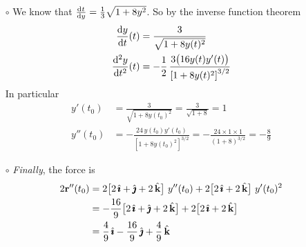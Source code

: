 \begin{solution}
\begin{itemize}
\item[$\circ$] We know that $\diff{t}{y} =\frac{1}{3}\sqrt{1+8y^2}$.
So by the inverse function theorem
\begin{align*}
\diff{y}{t}(t) 
   &=\frac{3}{\sqrt{1+8y(t)^2}} \\
\difftwo{y}{t}(t) 
   &=-\frac{1}{2}\,\frac{3\big(16y(t)y'(t)\big)}{{[1+8y(t)^2]}^{3/2}} \\
\end{align*}
In particular 
\begin{align*}
y'(t_0) 
   &=\frac{3}{\sqrt{1+8y(t_0)^2}}
    =\frac{3}{\sqrt{1+8}}
    =1 \\
y''(t_0) 
   &=-\frac{24\,y(t_0)y'(t_0)}{{[1+8y(t_0)^2]}^{3/2}}
    = - \frac{24\times 1\times 1}{{(1+8)}^{3/2}}
    = - \frac{8}{9}
\end{align*}

\item[$\circ$] \emph{Finally}, the force is 
\begin{align*}
2\mathbf{r}''(t_0) &= 2\big[2\,\hat{\pmb{\imath}}+\hat{\pmb{\jmath}} + 2\,\hat{\mathbf{k}}\big]\ y''(t_0) 
         + 2\big[2\,\hat{\pmb{\imath}}+ 2\,\hat{\mathbf{k}}\big]\ y'(t_0)^2  \\
&= -\frac{16}{9}\big[2\,\hat{\pmb{\imath}}+\hat{\pmb{\jmath}} + 2\,\hat{\mathbf{k}}\big] +2\big[2\,\hat{\pmb{\imath}}+ 2\,\hat{\mathbf{k}}\big] \\
&= \frac{4}{9}\,\hat{\pmb{\imath}} -\frac{16}{9}\,\hat{\pmb{\jmath}} + \frac{4}{9}\,\hat{\mathbf{k}}
\end{align*}
\end{itemize}


\end{solution}
